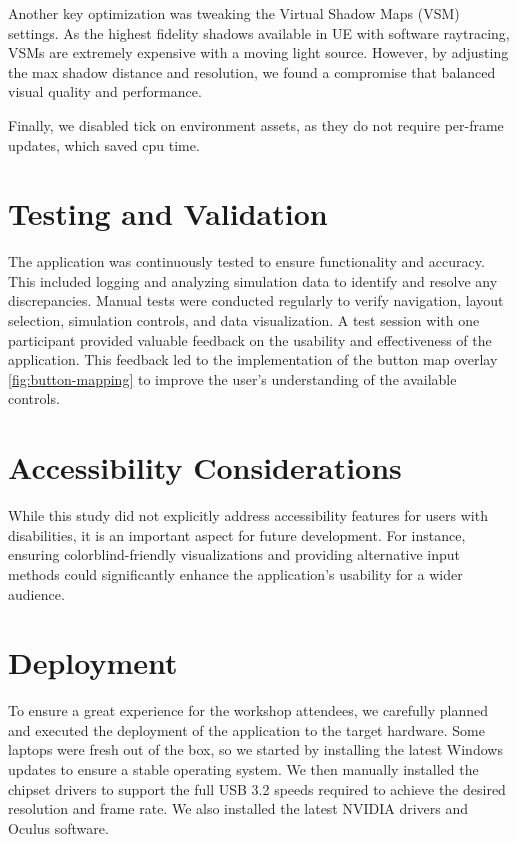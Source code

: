 \documentclass[draft, final]{vutinfth} %
\begin{document}
Another key optimization was tweaking the Virtual Shadow Maps (VSM) settings. As the highest fidelity shadows available in UE with software raytracing, VSMs are extremely expensive with a moving light source. However, by adjusting the max shadow distance and resolution, we found a compromise that balanced visual quality and performance.

Finally, we disabled tick on environment assets, as they do not require per-frame updates, which saved cpu time.

\section{Testing and Validation}

The application was continuously tested to ensure functionality and accuracy. This included logging and analyzing simulation data to identify and resolve any discrepancies. Manual tests were conducted regularly to verify navigation, layout selection, simulation controls, and data visualization. A test session with one participant provided valuable feedback on the usability and effectiveness of the application. This feedback led to the implementation of the button map overlay \ref{fig:button-mapping} to improve the user's understanding of the available controls.

\section{Accessibility Considerations}

While this study did not explicitly address accessibility features for users with disabilities, it is an important aspect for future development. For instance, ensuring colorblind-friendly visualizations and providing alternative input methods could significantly enhance the application's usability for a wider audience.

\section{Deployment}

To ensure a great experience for the workshop attendees, we carefully planned and executed the deployment of the application to the target hardware. Some laptops were fresh out of the box, so we started by installing the latest Windows updates to ensure a stable operating system. We then manually installed the chipset drivers to support the full USB 3.2 speeds required to achieve the desired resolution and frame rate. We also installed the latest NVIDIA drivers and Oculus software.
\end{document}
